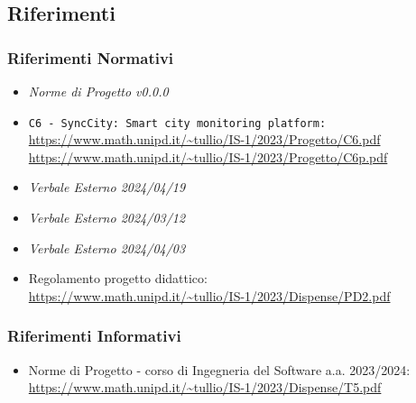 \subsection{Riferimenti}
\subsubsection{Riferimenti Normativi}
\begin{itemize}
	\setlength\itemsep{0em}
	\item \textit{Norme di Progetto v0.0.0}
	\item {} \texttt{C6 - SyncCity: Smart city monitoring platform:} \\ \url{https://www.math.unipd.it/~tullio/IS-1/2023/Progetto/C6.pdf} \\ \url{https://www.math.unipd.it/~tullio/IS-1/2023/Progetto/C6p.pdf}
	\item \textit{Verbale Esterno 2024/04/19}
    \item \textit{Verbale Esterno 2024/03/12}
	\item \textit{Verbale Esterno 2024/04/03}
	\item Regolamento progetto didattico: \\ \url{https://www.math.unipd.it/~tullio/IS-1/2023/Dispense/PD2.pdf}
\end{itemize}
\subsubsection{Riferimenti Informativi}
\begin{itemize}
	\setlength\itemsep{0em}
	\item Norme di Progetto - corso di Ingegneria del Software a.a. 2023/2024: \\ \url{https://www.math.unipd.it/~tullio/IS-1/2023/Dispense/T5.pdf}
\end{itemize}
\newpage
